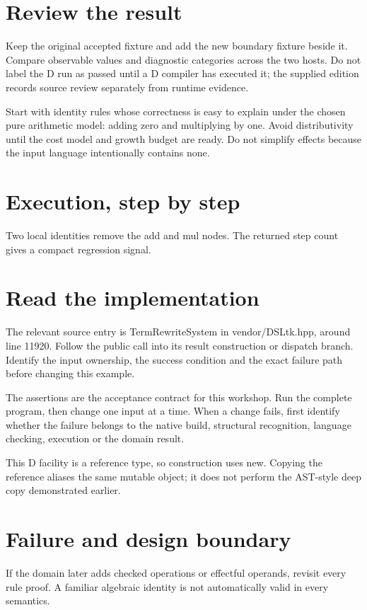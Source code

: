 \section*{Review the result}
Keep the original accepted fixture and add the new boundary fixture beside it. Compare observable values and diagnostic categories across the two hosts. Do not label the D run as passed until a D compiler has executed it; the supplied edition records source review separately from runtime evidence.

\clearpage
{}
Start with identity rules whose correctness is easy to explain under the chosen pure arithmetic model: adding zero and multiplying by one. Avoid distributivity until the cost model and growth budget are ready. Do not simplify effects because the input language intentionally contains none.


\section*{Execution, step by step}
Two local identities remove the add and mul nodes. The returned step count gives a compact regression signal.

\section*{Read the implementation}
The relevant source entry is TermRewriteSystem in vendor/DSLtk.hpp, around line 11920. Follow the public call into its result construction or dispatch branch. Identify the input ownership, the success condition and the exact failure path before changing this example.

The assertions are the acceptance contract for this workshop. Run the complete program, then change one input at a time. When a change fails, first identify whether the failure belongs to the native build, structural recognition, language checking, execution or the domain result.

\clearpage
{}
This D facility is a reference type, so construction uses new. Copying the reference aliases the same mutable object; it does not perform the AST-style deep copy demonstrated earlier.


\section*{Failure and design boundary}
If the domain later adds checked operations or effectful operands, revisit every rule proof. A familiar algebraic identity is not automatically valid in every semantics.


